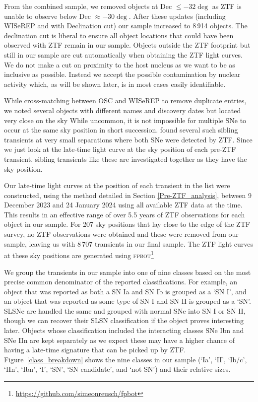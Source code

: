 \documentclass[a4paper,oneside,12pt, class=Latex/Classes/PhDthesisPSnPDF, crop=false]{standalone}
\begin{document}
From the combined sample, we removed objects at Dec $\leq -32\deg$ as ZTF is unable to observe below Dec $\approx -30\deg$. After these updates (including WISeREP and with Declination cut) our sample increased to 8\,914 objects. The declination cut is liberal to ensure all object locations that could have been observed with ZTF remain in our sample. Objects outside the ZTF footprint but still in our sample are cut automatically when obtaining the ZTF light curves. We do not make a cut on proximity to the host nucleus as we want to be as inclusive as possible. Instead we accept the possible contamination by nuclear activity which, as will be shown later, is in most cases easily identifiable.

While cross-matching between OSC and WISeREP to remove duplicate entries, we noted several objects with different names and discovery dates but located very close on the sky While uncommon, it is not impossible for multiple SNe to occur at the same sky position in short succession. \citet{Terwel_2024_paper1} found several such sibling transients at very small separations where both SNe were detected by ZTF. Since we just look at the late-time light curve at the sky position of each pre-ZTF transient, sibling transients like these are investigated together as they have the sky position.

Our late-time light curves at the position of each transient in the list were constructed, using the method detailed in Section \ref{Pre-ZTF_analysis}, between 9 December 2023 and 24 January 2024 using all available ZTF data at the time. This results in an effective range of over 5.5 years of ZTF observations for each object in our sample. For 207 sky positions that lay close to the edge of the ZTF survey, no ZTF observations were obtained and these were removed from our sample, leaving us with 8\,707 transients in our final sample. The ZTF light curves at these sky positions are generated using \textsc{fpbot}\footnote{\url{https://github.com/simeonreusch/fpbot}} \citep{fpbot}

We group the transients in our sample into one of nine classes based on the most precise common denominator of the reported classifications. For example, an object that was reported as both a SN Ia and SN Ib is grouped as a `SN I', and an object that was reported as some type of SN I and SN II is grouped as a `SN'. SLSNe are handled the same and grouped with normal SNe into SN I or SN II, though we can recover their SLSN classification if the object proves interesting later. Objects whose classification included the interacting classes SNe Ibn and SNe IIn are kept separately as we expect these may have a higher chance of having a late-time signature that can be picked up by ZTF. Figure~\ref{class_breakdown} shows the nine classes in our sample (`Ia', `II', `Ib/c', `IIn', `Ibn', `I', `SN', `SN candidate', and `not SN') and their relative sizes. 
\end{document}

